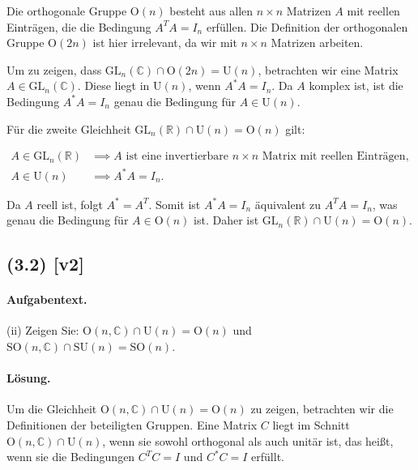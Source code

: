 \documentclass[11pt,a4paper]{article}
\begin{document}
Die orthogonale Gruppe $\mathrm{O}(n)$ besteht aus allen $n \times n$ Matrizen $A$ mit reellen Einträgen, die die Bedingung $A^T A = I_n$ erfüllen. Die Definition der orthogonalen Gruppe $\mathrm{O}(2n)$ ist hier irrelevant, da wir mit $n \times n$ Matrizen arbeiten.

Um zu zeigen, dass $\mathrm{GL}_n(\mathbb{C}) \cap \mathrm{O}(2n) = \mathrm{U}(n)$, betrachten wir eine Matrix $A \in \mathrm{GL}_n(\mathbb{C})$. Diese liegt in $\mathrm{U}(n)$, wenn $A^* A = I_n$. Da $A$ komplex ist, ist die Bedingung $A^* A = I_n$ genau die Bedingung für $A \in \mathrm{U}(n)$.

Für die zweite Gleichheit $\mathrm{GL}_n(\mathbb{R}) \cap \mathrm{U}(n) = \mathrm{O}(n)$ gilt:

\begin{align*}
A \in \mathrm{GL}_n(\mathbb{R}) &\implies A \text{ ist eine invertierbare } n \times n \text{ Matrix mit reellen Einträgen}, \\
A \in \mathrm{U}(n) &\implies A^* A = I_n.
\end{align*}

Da $A$ reell ist, folgt $A^* = A^T$. Somit ist $A^* A = I_n$ äquivalent zu $A^T A = I_n$, was genau die Bedingung für $A \in \mathrm{O}(n)$ ist. Daher ist $\mathrm{GL}_n(\mathbb{R}) \cap \mathrm{U}(n) = \mathrm{O}(n)$.


\subsection*{(3.2) [v2]}
\paragraph{Aufgabentext.}
(ii)  Zeigen Sie: $\mathrm{O}(n, \mathbb{C}) \cap \mathrm{U}(n)=\mathrm{O}(n)$ und $\mathrm{SO}(n, \mathbb{C}) \cap \mathrm{SU}(n)=\mathrm{SO}(n)$.

\paragraph{Lösung.}
Um die Gleichheit $\mathrm{O}(n, \mathbb{C}) \cap \mathrm{U}(n) = \mathrm{O}(n)$ zu zeigen, betrachten wir die Definitionen der beteiligten Gruppen. Eine Matrix $C$ liegt im Schnitt $\mathrm{O}(n, \mathbb{C}) \cap \mathrm{U}(n)$, wenn sie sowohl orthogonal als auch unitär ist, das heißt, wenn sie die Bedingungen $C^T C = I$ und $C^* C = I$ erfüllt. 
\end{document}
